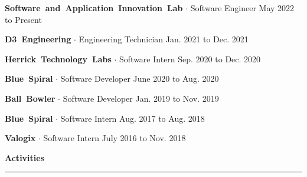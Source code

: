 \documentclass{article}
\newcommand{\rSection}[1] {
  \textcolor{header-blue} {
    \textbf{{\fontsize{0.5cm}{0.45cm}\selectfont \hbox{#1}}} \\
    \rule{0.30\textwidth}{0.1cm}
  }
}
\newcommand{\rSubSubSection}[1] {
  \textbf{{\fontsize{0.35cm}{0.45cm}\selectfont \hbox{#1}}}
}
\begin{document}
\rSubSubSection{Software and Application Innovation Lab} $ \cdot $ Software Engineer \hfill May 2022 to Present \par
\vspace{-10pt}
    
\vspace{-10pt}

\rSubSubSection{D3 Engineering} $ \cdot $ Engineering Technician \hfill Jan. 2021 to Dec. 2021 \par
\vspace{-10pt}
    
\vspace{-10pt}

\rSubSubSection{Herrick Technology Labs} $ \cdot $ Software Intern \hfill Sep. 2020 to Dec. 2020 \par
\vspace{-10pt}
    
\vspace{-10pt}

\rSubSubSection{Blue Spiral} $ \cdot $ Software Developer \hfill June 2020 to Aug. 2020 \par
\vspace{-10pt}
    
\vspace{-10pt}

\rSubSubSection{Ball Bowler} $ \cdot $ Software Developer \hfill Jan. 2019 to Nov. 2019 \par
\vspace{-10pt}
    
\vspace{-10pt}

\rSubSubSection{Blue Spiral} $ \cdot $ Software Intern \hfill Aug. 2017 to Aug. 2018 \par
\vspace{-10pt}
    
\vspace{-10pt}

\rSubSubSection{Valogix} $ \cdot $ Software Intern \hfill July 2016 to Nov. 2018 \par
\vspace{-10pt}
    
\vspace{-10pt}

\rSection{Activities} \par
\end{document}

